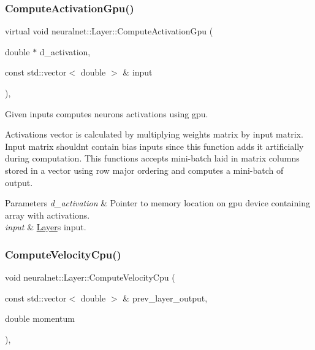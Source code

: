 \subsubsection{\texorpdfstring{Compute\+Activation\+Gpu()}{ComputeActivationGpu()}}
{\footnotesize\ttfamily virtual void neuralnet\+::\+Layer\+::\+Compute\+Activation\+Gpu (\begin{DoxyParamCaption}\item[{double $\ast$}]{d\+\_\+activation,  }\item[{const std\+::vector$<$ double $>$ \&}]{input }\end{DoxyParamCaption})\hspace{0.3cm}{\ttfamily [protected]}, {\ttfamily [virtual]}}



Given inputs computes neurons\textquotesingle{} activations using gpu. 

Activations vector is calculated by multiplying weights matrix by input matrix. Input matrix shouldn\textquotesingle{}t contain bias inputs since this function adds it artificially during computation. This functions accepts mini-\/batch laid in matrix columns stored in a vector using row major ordering and computes a mini-\/batch of output.


\begin{DoxyParams}{Parameters}
{\em d\+\_\+activation} & Pointer to memory location on gpu device containing array with activations. \\
\hline
{\em input} & \hyperlink{classneuralnet_1_1Layer}{Layer}\textquotesingle{}s input. \\
\hline
\end{DoxyParams}
\mbox{\label{classneuralnet_1_1Layer_a7a2716aec90e66d785acd202b297b4bb}} 
\subsubsection{\texorpdfstring{Compute\+Velocity\+Cpu()}{ComputeVelocityCpu()}}
{\footnotesize\ttfamily void neuralnet\+::\+Layer\+::\+Compute\+Velocity\+Cpu (\begin{DoxyParamCaption}\item[{const std\+::vector$<$ double $>$ \&}]{prev\+\_\+layer\+\_\+output,  }\item[{double}]{momentum }\end{DoxyParamCaption})\hspace{0.3cm}{\ttfamily [protected]}, {\ttfamily [virtual]}}



